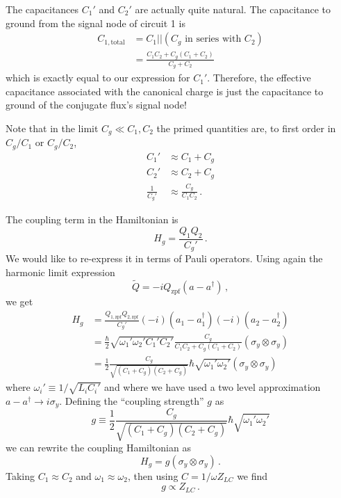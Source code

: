 The capacitances $C_1'$ and $C_2'$ are actually quite natural.
The capacitance to ground from the signal node of circuit 1 is
\begin{align*}
  C_{1, \textrm{total}}
  &= C_1 || (C_g \textrm{ in series with } C_2) \\
  &= \frac{C_1 C_2 + C_g(C_1+C_2)}{C_g+C_2}
\end{align*}
which is exactly equal to our expression for $C_1'$.
Therefore, the effective capacitance associated with the canonical charge is just the capacitance to ground of the conjugate flux's signal node!

Note that in the limit $C_g \ll C_1, C_2$ the primed quantities are, to first order in $C_g / C_1$ or $C_g / C_2$,
\begin{align*}
  C_1' & \approx C_1 + C_g \\
  C_2' & \approx C_2 + C_g \\
  \frac{1}{C_g'} & \approx \frac{C_g}{C_1 C_2} \, .
\end{align*}

The coupling term in the Hamiltonian is
\begin{equation}
  H_g = \frac{ Q_1 Q_2} {C_g'} \, . \label{eq:sec:coupling:H_g}
\end{equation}
We would like to re-express it in terms of Pauli operators.
Using again the harmonic limit expression
\begin{equation}
  \tilde{Q} = -i Q_{\textrm{zpf}} (a - a^{\dagger}) \, ,
\end{equation}
we get
\begin{align*}
  H_g
  &= \frac{Q_{1,\textrm{zpf}}Q_{2,\textrm{zpf}}}{C_g'}
    (-i)(a_1 - a_1^{\dagger}) (-i)(a_2 - a_2^{\dagger}) \\
  &= \frac{\hbar}{2} \sqrt{\omega_1' \omega_2' C_1' C_2'}
    \frac{C_g}{C_1 C_2 + C_g(C_1 + C_2)} (\sigma_y \otimes \sigma_y) \\
  &= \frac{1}{2}\frac{C_g}{\sqrt{(C_1 + C_g) (C_2 + C_g)}} \hbar
    \sqrt{\omega_1' \omega_2'} (\sigma_y \otimes \sigma_y)
\end{align*}
where $\omega_i' \equiv 1 / \sqrt{L_i C_i'}$ and where we have used a two level approximation \mbox{$a - a^\dagger \rightarrow i \sigma_y$}.
Defining the ``coupling strength'' $g$ as
\begin{equation}
  g \equiv \frac{1}{2} \frac{C_g}{\sqrt{(C_1 + C_g) (C_2 + C_g)}} \hbar \sqrt{\omega_1' \omega_2'}
\end{equation}
we can rewrite the coupling Hamiltonian as
\begin{equation}
  H_g = g \left( \sigma_y \otimes \sigma_y \right) \, .
\end{equation}
Taking $C_1 \approx C_2$ and $\omega_1 \approx \omega_2$, then using $C = 1 / \omega Z_{LC}$ we find
\begin{equation}
  g \propto Z_{LC} \, .
\end{equation}

